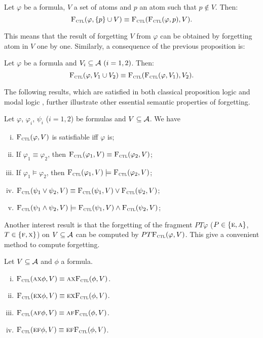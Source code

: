 \documentclass{article}
\begin{document}
\begin{proposition}\label{disTF}
Let $\varphi$ be a formula, $V$ a set of atoms and $p$ an atom such that $p \notin V$. Then:
\[
{\textsc{F}_{\textsc{ctl}}}(\varphi, \{p\} \cup V) \equiv {\textsc{F}_{\textsc{ctl}}}({\textsc{F}_{\textsc{ctl}}}(\varphi, p), V).
\]
\end{proposition}
This means that the result of forgetting $V$ from $\varphi$ can be obtained by forgetting atom in $V$ one by one.
Similarly, a consequence of the previous proposition is:

\begin{corollary}\label{disTFV}
Let $\varphi$ be a formula and $V_i\subseteq{\cal A}~(i=1,2)$. Then:
\[
{\textsc{F}_{\textsc{ctl}}}(\varphi, V_1 \cup V_2) \equiv {\textsc{F}_{\textsc{ctl}}}({\textsc{F}_{\textsc{ctl}}}(\varphi, V_1), V_2).
\]
\end{corollary}


The following results, which are satisfied in both classical proposition logic and modal logic \SFive, further illustrate other essential semantic properties of forgetting.
\begin{proposition}\label{pro:ctl:forget:1}
Let $\varphi$, $\varphi_i$, $\psi_i$ ($i=1,2$) be formulas and $V\subseteq {\cal A}$. We have
\begin{enumerate}[(i)]
  \item ${\textsc{F}_{\textsc{ctl}}}(\varphi, V)$ is satisfiable iff $\varphi$ is;
  \item If $\varphi_1 \equiv \varphi_2$, then ${\textsc{F}_{\textsc{ctl}}}(\varphi_1, V) \equiv {\textsc{F}_{\textsc{ctl}}}(\varphi_2, V)$;
  \item If $\varphi_1 \models \varphi_2$, then ${\textsc{F}_{\textsc{ctl}}}(\varphi_1, V) \models {\textsc{F}_{\textsc{ctl}}}(\varphi_2, V)$;
  \item ${\textsc{F}_{\textsc{ctl}}}(\psi_1 \vee \psi_2, V) \equiv {\textsc{F}_{\textsc{ctl}}}(\psi_1, V) \vee {\textsc{F}_{\textsc{ctl}}}(\psi_2, V)$;
  \item ${\textsc{F}_{\textsc{ctl}}}(\psi_1 \wedge \psi_2, V) \models {\textsc{F}_{\textsc{ctl}}}(\psi_1, V) \wedge {\textsc{F}_{\textsc{ctl}}}(\psi_2, V)$;
\end{enumerate}
\end{proposition}


Another interest result is that the forgetting of the fragment $P T \varphi$ ($P\in \{\textsc{e}, \textsc{a}\}$, $T \in \{\textsc{f}, \textsc{x}\}$) on $V\subseteq {\cal A}$ can be computed by $PT {\textsc{F}_{\textsc{ctl}}}(\varphi, V)$. This give a convenient method to compute forgetting.
\begin{proposition}\label{pro:ctl:forget:2}
  Let $V\subseteq\cal A$ and $\phi$ a formula.
  \begin{enumerate}[(i)]
    \item ${\textsc{F}_{\textsc{ctl}}}(\textsc{a}\textsc{x}\phi,V)\equiv\textsc{a}\textsc{x} {\textsc{F}_{\textsc{ctl}}}(\phi,V)$.
    \item ${\textsc{F}_{\textsc{ctl}}}(\textsc{e}\textsc{x}\phi,V)\equiv\textsc{e}\textsc{x} {\textsc{F}_{\textsc{ctl}}}(\phi,V)$.
    \item ${\textsc{F}_{\textsc{ctl}}}(\textsc{a}\textsc{f}\phi,V)\equiv\textsc{a}\textsc{f} {\textsc{F}_{\textsc{ctl}}}(\phi,V)$.
    \item ${\textsc{F}_{\textsc{ctl}}}(\textsc{e}\textsc{f}\phi,V)\equiv\textsc{e}\textsc{f} {\textsc{F}_{\textsc{ctl}}}(\phi,V)$.
  \end{enumerate}
\end{proposition}
\end{document}
